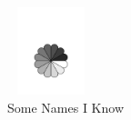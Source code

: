 \begin{figure}
\centering
\includegraphics[height=1in, width=1in]{images/rosette.pdf}
\caption{Some Names I Know}
\end{figure}
